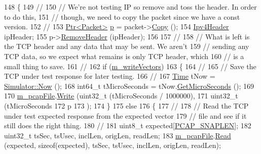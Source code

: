 \begin{DoxyCode}
148 \{
149   \textcolor{comment}{//}
150   \textcolor{comment}{// We're not testing IP so remove and toss the header.  In order to do this,}
151   \textcolor{comment}{// though, we need to copy the packet since we have a const version.}
152   \textcolor{comment}{//}
153   \hyperlink{classns3_1_1Ptr}{Ptr<Packet>} \hyperlink{lte__link__budget_8m_ac9de518908a968428863f829398a4e62}{p} = packet->\hyperlink{classns3_1_1Packet_a5d5c70802a5f77fc5f0001e0cfc1898b}{Copy} ();
154   \hyperlink{classns3_1_1Ipv4Header}{Ipv4Header} ipHeader;
155   p->\hyperlink{classns3_1_1Packet_a0961eccf975d75f902d40956c93ba63e}{RemoveHeader} (ipHeader);
156 
157   \textcolor{comment}{//}
158   \textcolor{comment}{// What is left is the TCP header and any data that may be sent.  We aren't}
159   \textcolor{comment}{// sending any TCP data, so we expect what remains is only TCP header, which}
160   \textcolor{comment}{// is a small thing to save.}
161   \textcolor{comment}{//}
162   \textcolor{keywordflow}{if} (\hyperlink{classNs3TcpInteroperabilityTestCase_a05b2ce8a52b36d9924ad9c7fda1168a9}{m\_writeVectors})
163     \{
164       \textcolor{comment}{//}
165       \textcolor{comment}{// Save the TCP under test response for later testing.}
166       \textcolor{comment}{//}
167       \hyperlink{classns3_1_1Time}{Time} tNow = \hyperlink{group__simulator_gac3635e2e87f7ce316c89290ee1b01d0d}{Simulator::Now} ();
168       int64\_t tMicroSeconds = tNow.\hyperlink{classns3_1_1Time_a2542b9273c336da11fcaf54e8bc6e4c8}{GetMicroSeconds} ();
169 
170       \hyperlink{classNs3TcpInteroperabilityTestCase_a0d3ad7f3621d79aa2db483829c3d04fc}{m\_pcapFile}.\hyperlink{classns3_1_1PcapFile_a3920f5bae95ca0021875e6e9c2630ccf}{Write} (uint32\_t (tMicroSeconds / 1000000), 
171                         uint32\_t (tMicroSeconds %
172                         p
173                         );
174     \}
175   \textcolor{keywordflow}{else}
176     \{
177       \textcolor{comment}{//}
178       \textcolor{comment}{// Read the TCP under test expected response from the expected vector}
179       \textcolor{comment}{// file and see if it still does the right thing.}
180       \textcolor{comment}{//}
181       uint8\_t expected[\hyperlink{ns3tcp-interop-test-suite_8cc_ae9a6b49b98d0c7917dda456f6771d2e1}{PCAP\_SNAPLEN}];
182       uint32\_t tsSec, tsUsec, inclLen, origLen, readLen;
183       \hyperlink{classNs3TcpInteroperabilityTestCase_a0d3ad7f3621d79aa2db483829c3d04fc}{m\_pcapFile}.\hyperlink{classns3_1_1PcapFile_a18c5045735408fe45a8cbc9e6b34a4fb}{Read} (expected, \textcolor{keyword}{sizeof}(expected), tsSec, tsUsec, inclLen, origLen, readLen);

\end{DoxyCode}
